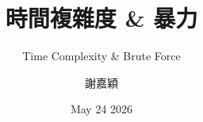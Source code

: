 

\title{時間複雜度 \& 暴力}
\subtitle{Time Complexity \& Brute Force}
\author{謝嘉穎}
\date{May 24 2026}



\begin{frame}
\vspace{-1.6em}
\titlepage
\end{frame}














